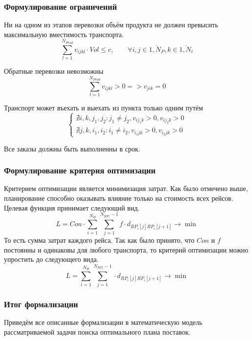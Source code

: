 	\subsubsection{Формулирование ограничений}     
	
	Ни на одном из этапов перевозки объём продукта не должен превысить максимальную вместимость транспорта.
	\begin{equation}
		\sum_{l=1}^{N_{Prod}} v_{ijkl} \cdot Vol \le c, \qquad \forall i, j \in \overline{1, N_P}, k \in \overline{1, N_t}
	\end{equation}

	Обратные перевозки невозможны
	\begin{equation}
		\sum_{l=1}^{N_{Prod}} v_{ijkl} > 0 => v_{jik} = 0
	\end{equation}

	Транспорт может въехать и выехать из пункта только одним путём
	\begin{equation}
		\left\{
		\begin{array}{ccc}
			\nexists i, k, j_1, j_2: j_1 \ne j_2, v_{ij_1k} > 0, v_{ij_2k} > 0 \\
			\nexists j, k, i_1, i_2: i_1 \ne i_2, v_{i_1jk} > 0, v_{i_2jk} > 0 
		\end{array}
		\right.
	\end{equation}

	Все заказы должны быть выполненны в срок. 
	
	\subsubsection{Формулирование критерия оптимизации}   
	Критерием оптимизации является минимизация затрат. Как было отмечено выше, планирование способно оказывать влияние только на стоимость всех рейсов. Целевая функция принимает следующий вид.
	\begin{equation}
		L = Con \cdot \sum_{i=1}^{N_R} \sum_{j=1}^{N_{RP_i} - 1} f \cdot d_{RP_i[j] RP_i[j+1]} \to \min
	\end{equation}
	То есть сумма затрат каждого рейса. Так как было принято, что $Con$ и $f$ постоянны и одинаковы для любого транспорта, то критерий оптимизации можно упростить до следующего вида.
	\begin{equation}
		L = \sum_{i=1}^{N_R} \sum_{j=1}^{N_{RP_i} - 1} \cdot d_{RP_i[j] RP_i[j+1]} \to \min
	\end{equation}

	\subsubsection*{Итог формализации}
	Приведём все описанные формализации в математическую модель рассматриваемой задачи поиска оптимального плана поставок.


